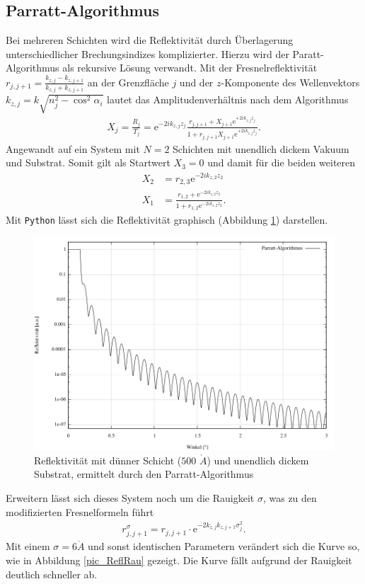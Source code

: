\subsection{Parratt-Algorithmus}
Bei mehreren Schichten wird die Reflektivität durch Überlagerung unterschiedlicher Brechungsindizes komplizierter. Hierzu wird der Paratt-Algorithmus als
rekursive Lösung verwandt. Mit der Fresnelreflektivität $r_{j,j+1} = \frac{k_{z,j}-k_{z,j+1}}{k_{z,j}+k_{z,j+1}}$ an der Grenzfläche $j$ und der $z$-Komponente 
des Wellenvektors $k_{z,j} = k\sqrt{n_j^2-\cos^2\alpha_i}$
lautet das Amplitudenverhältnis nach dem Algorithmus
\begin{align}
 X_j = \frac{R_j}{T_j} = \text{e}^{-2ik_{z,j}z_j}\frac{r_{j,j+1} + X_{j+1} \text{e}^{+2ik_{z,j}z_j}}{1 + r_{j,j+1} X_{j+1}\text{e}^{+2ik_{z,j}z_j}}.
\end{align}
Angewandt auf ein System mit $N=2$ Schichten mit unendlich dickem Vakuum und Substrat. Somit gilt als Startwert $X_3 = 0$ und damit für die beiden weiteren
\begin{align}
 X_2 &= r_{2,3}\text{e}^{-2ik_{z,2}z_2}\\
 X_1 &= \frac{r_{1,2}+\text{e}^{-2ik_{z,2}z_2}}{1+r_{1,2}\text{e}^{-2ik_{z,2}z_2}}.
\end{align}
Mit \texttt{Python} lässt sich die Reflektivität graphisch (Abbildung \ref{pic_ReflNormal}) darstellen.

\begin{figure}[H]
 \includegraphics[width=\textwidth]{../pics/normal.jpg}
 \caption{Reflektivität mit dünner Schicht ($500$ $\mathring{A}$) und unendlich dickem Substrat, ermittelt durch den Parratt-Algorithmus}
 \label{pic_ReflNormal}
\end{figure}
\noindent
Erweitern lässt sich dieses System noch um die Rauigkeit $\sigma$, was zu den modifizierten Fresnelformeln führt
\begin{align}
 r^\sigma_{j,j+1} = r_{j,j+1} \cdot \text{e}^{-2k_{z,j}k_{z,j+1}\sigma_j^2}.
\end{align}
Mit einem $\sigma = 6\mathring{A}$ und sonst identischen Parametern verändert sich die Kurve so, wie in Abbildung \ref{pic_ReflRau} gezeigt. Die Kurve fällt aufgrund
der Rauigkeit deutlich schneller ab.

